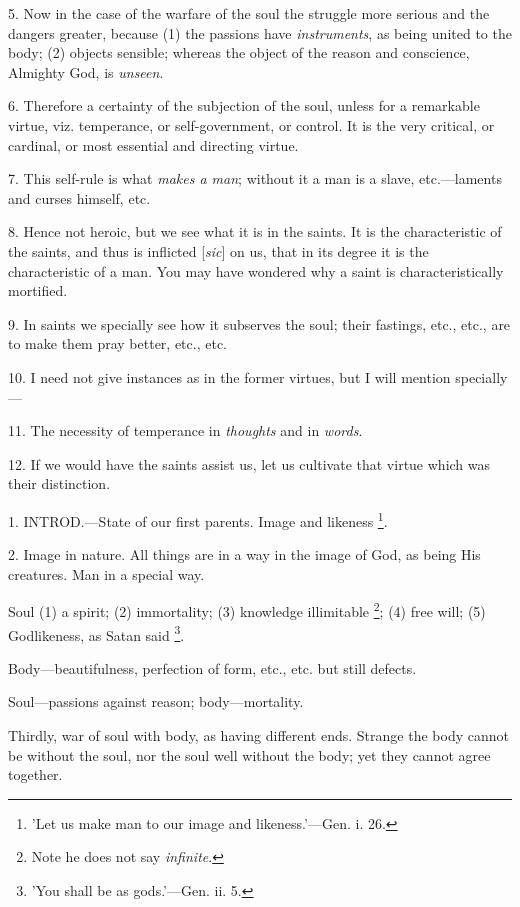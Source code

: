5. Now in the case of the warfare of the soul the
struggle more serious and the dangers greater, because (1) the
passions have \emph{instruments}, as being united to the body; (2)
objects sensible; whereas the object of the reason and
conscience, Almighty God, is \emph{unseen}.

6. Therefore a certainty of the subjection of the
soul, unless for a remarkable virtue, viz. temperance, or
self-government, or control. It is the very critical, or cardinal, or
most essential and directing virtue.

7. This self-rule is what \emph{makes a man};
without it a man is a slave, etc.—laments and curses himself, etc.

8. Hence not heroic, but we see what it is in the
saints. It is the characteristic of the saints, and thus is inflicted
[\emph{sic}] on us, that in its degree it is the characteristic of a
man. You may have wondered why a saint is characteristically
mortified.

9. In saints we specially see how it subserves
the soul; their fastings, etc., etc., are to make them pray better,
etc., etc.

10. I need not give instances as in the former
virtues, but I will mention specially—

11. The necessity of temperance in \emph{thoughts}
and in \emph{words}.

12. If we would have the saints assist us, let us
cultivate that virtue which was their distinction.


1. INTROD.—State
of our first parents. Image and likeness \footnote{'Let us make man to our
image and likeness.'—Gen. i. 26.}.

2. Image in nature. All things are in a way in
the image of God, as being His creatures. Man in a special way.

Soul (1) a spirit; (2) immortality; (3) knowledge
illimitable \footnote{Note he does not say \emph{infinite}.}; (4) free
will; (5) Godlikeness, as Satan said \footnote{'You shall be as
gods.'—Gen. ii. 5.}.

Body—beautifulness, perfection of form, etc.,
etc. but still defects.

Soul—passions against reason; body—mortality.

Thirdly, war of soul with body, as having
different ends. Strange the body cannot be without the soul, nor the
soul well without the body; yet they cannot agree together.

